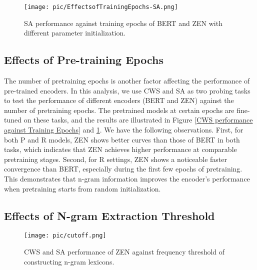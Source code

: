 \documentclass[11pt,a4paper]{article}
\begin{document}
\begin{CJK}{UTF8}{gbsn}
\begin{figure}[t]
	\begin{center}
		\texttt{[image: pic/EffectsofTrainingEpochs-SA.png]}
        \caption{SA performance against training epochs of BERT and ZEN with different parameter initialization.}
        \label{SA performance against Training Epochs}
	\end{center}
	\vspace{-1.0em}
\end{figure}








\subsection{Effects of Pre-training Epochs}



The number of pretraining epochs is another factor affecting the performance of pre-trained encoders.
In this analysis,
we use CWS and SA as two probing tasks to test the performance of different encoders (BERT and ZEN) against the number of pretraining epochs.
The pretrained models at certain epochs are fine-tuned on these tasks, and the
results are illustrated in Figure \ref{CWS performance against Training Epochs} and \ref{SA performance against Training Epochs}. We have the following observations.
First, for both P and R models, ZEN shows  better curves than those of BERT in both tasks, which indicates that ZEN achieves higher performance at comparable pretraining stages.
Second, for R settings, ZEN shows a noticeable faster convergence than BERT, especially during the first few epochs of pretraining. This demonstrates that n-gram information improves the encoder's performance when pretraining starts from random initialization.


\subsection{Effects of N-gram Extraction Threshold}

\begin{figure}[t]
	\begin{center}
		\texttt{[image: pic/cutoff.png]}
        \caption{CWS and SA performance of ZEN against frequency threshold of constructing n-gram lexicons.}
        \label{fig:n-gram frequency threshold}
	\end{center}
	\vspace{-2.0em}
\end{figure}


\end{CJK}
\end{document}
